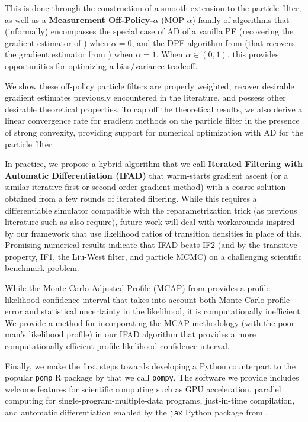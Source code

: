 \documentclass{article}
\begin{document}
This is done through the construction of a smooth extension to the particle filter, as well as a \textbf{Measurement Off-Policy-$\alpha$} (MOP-$\alpha$) family of algorithms that (informally) encompasses the special case of AD of a vanilla PF (recovering the gradient estimator of \citet{blei2018vsmc}) when $\alpha=0$, and the DPF algorithm from \citet{scibior2021dpf} (that recovers the gradient estimator from \citet{doucet2011sf}) when $\alpha=1$. When $\alpha \in (0,1)$, this provides opportunities for optimizing a bias/variance tradeoff. 

We show these off-policy particle filters are properly weighted, recover desirable gradient estimates previously encountered in the literature, and possess other desirable theoretical properties. To cap off the theoretical results, we also derive a linear convergence rate for gradient methods on the particle filter in the presence of strong convexity, providing support for numerical optimization with AD for the particle filter.

In practice, we propose a hybrid algorithm that we call \textbf{Iterated Filtering with Automatic Differentiation (IFAD)} that warm-starts gradient ascent (or a similar iterative first or second-order gradient method) with a coarse solution obtained from a few rounds of iterated filtering. While this requires a differentiable simulator compatible with the reparametrization trick (as previous literature such as \citet{corenflos21} also require), future work will deal with workarounds inspired by our framework that use likelihood ratios of transition densities in place of this. Promising numerical results indicate that IFAD beats IF2 (and by the transitive property, IF1, the Liu-West filter, and particle MCMC) on a challenging scientific benchmark problem.

While the Monte-Carlo Adjusted Profile (MCAP) from \citet{Ionides_mcap} provides a profile likelihood confidence interval that takes into account both Monte Carlo profile error and statistical uncertainty in the likelihood, it is computationally inefficient.  We provide a method for incorporating the MCAP methodology (with the poor man's likelihood profile) in our IFAD algorithm that provides a more computationally efficient profile likelihood confidence interval. 

Finally, we make the first steps towards developing a Python counterpart to the popular \texttt{pomp} R package by \citet{king16, king2017pompmanual} that we call \texttt{pompy}. The software we provide includes welcome features for scientific computing such as GPU acceleration, parallel computing for single-program-multiple-data programs, just-in-time compilation, and automatic differentiation enabled by the \texttt{jax} Python package from \citet{jax2018github}. 
\end{document}
